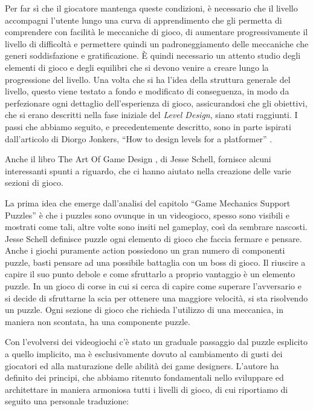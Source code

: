 Per far sì che il giocatore mantenga queste condizioni, è necessario che il livello accompagni l’utente lungo una curva di apprendimento che gli permetta di comprendere con facilità le meccaniche di gioco, di aumentare progressivamente il livello di difficoltà e permettere quindi un padroneggiamento delle meccaniche che generi soddisfazione e gratificazione.
È quindi necessario un attento studio degli elementi di gioco e degli equilibri che si devono venire a creare lungo la progressione del livello.
Una volta che si ha l’idea della struttura generale del livello, questo viene testato a fondo e modificato di conseguenza, in modo da perfezionare ogni dettaglio dell’esperienza di gioco, assicurandosi che gli obiettivi, che si erano descritti nella fase iniziale del \textit{Level Design}, siano stati raggiunti.
I passi che abbiamo seguito, e precedentemente descritto, sono in parte ispirati dall’articolo di Diorgo Jonkers, “How to design levels for a platformer” \cite{DiorgoJonkersArticle}.

Anche il libro The Art Of Game Design \cite{artOfGameDesign}, di Jesse Schell, fornisce alcuni interessanti spunti a riguardo, che ci hanno aiutato nella creazione delle varie sezioni di gioco.

La prima idea che emerge dall’analisi del capitolo “Game Mechanics Support Puzzles” è che i puzzles sono ovunque in un videogioco, spesso sono visibili e mostrati come tali, altre volte sono insiti nel gameplay, così da sembrare nascosti. Jesse Schell definisce puzzle ogni elemento di gioco che faccia fermare e pensare. Anche i giochi puramente action possiedono un gran numero di componenti puzzle, basti pensare ad una possibile battaglia con un boss di gioco. Il riuscire a capire il suo punto debole e come sfruttarlo a proprio vantaggio è un elemento puzzle. In un gioco di corse in cui si cerca di capire come superare l’avversario e si decide di sfruttarne la scia per ottenere una maggiore velocità, si sta risolvendo un puzzle. Ogni sezione di gioco che richieda l’utilizzo di una meccanica, in maniera non scontata, ha una componente puzzle.

Con l’evolversi dei videogiochi c’è stato un graduale passaggio dal puzzle esplicito a quello implicito, ma è esclusivamente dovuto al cambiamento di gusti dei giocatori ed alla maturazione delle abilità dei game designers.
L’autore ha definito dei principi, che abbiamo ritenuto fondamentali nello sviluppare ed architettare in maniera armoniosa tutti i livelli di gioco, di cui riportiamo di seguito una personale traduzione:

